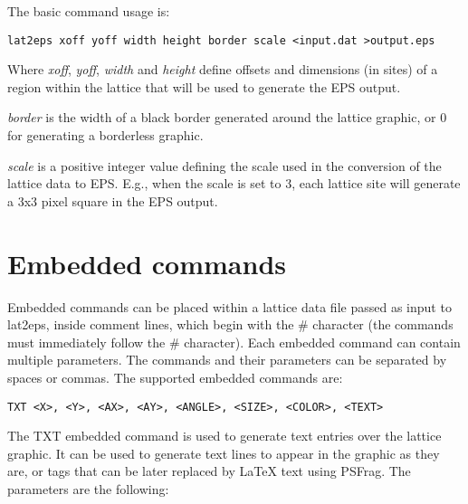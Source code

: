 \documentclass[a4paper]{article}
\begin{document}
The basic command usage is:
\bigbreak

\texttt{lat2eps  xoff yoff width height border scale  <input.dat  >output.eps}
\bigbreak

Where \textit{xoff}, \textit{yoff}, \textit{width} and \textit{height} define offsets and dimensions (in sites) of a region within the lattice that will be used to generate the EPS output.
\bigbreak

\textit{border} is the width of a black border generated around the lattice graphic, or 0 for generating a borderless graphic.
\bigbreak

\textit{scale} is a positive integer value defining the scale used in the conversion of the lattice data to EPS. E.g., when the scale is set to 3, each lattice site will generate a 3x3 pixel square in the EPS output.
\bigbreak


\section{Embedded commands}
\bigbreak

Embedded commands can be placed within a lattice data file passed as input to lat2eps, inside comment lines, which begin with the \# character (the commands must immediately follow the \# character). Each embedded command can contain multiple parameters. The commands and their parameters can be separated by spaces or commas. The supported embedded commands are:
\bigbreak\bigbreak

\texttt{TXT <X>, <Y>, <AX>, <AY>, <ANGLE>, <SIZE>, <COLOR>, <TEXT>}
\bigbreak

The TXT embedded command is used to generate text entries over the lattice graphic. It can be used to generate text lines to appear in the graphic as they are, or tags that can be later replaced by LaTeX text using PSFrag. The parameters are the following:
\end{document}
